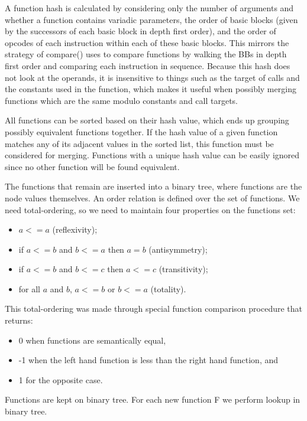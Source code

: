 A function hash is calculated by considering only the number of arguments and
whether a function contains variadic parameters, the order of basic blocks (given by the
successors of each basic block in depth first order), and the order of
opcodes of each instruction within each of these basic blocks.
This mirrors the strategy of compare() uses to compare functions by walking the BBs in depth
first order and comparing each instruction in sequence. Because this hash
does not look at the operands, it is insensitive to things such as the
target of calls and the constants used in the function, which makes it useful
when possibly merging functions which are the same modulo constants and call
targets.


All functions can be sorted based on their hash value, which ends up grouping
possibly equivalent functions together.
If the hash value of a given function matches any of its adjacent values in
the sorted list, this function must be considered for merging.
Functions with a unique hash value can be easily ignored since no other function
will be found equivalent.


The functions that remain are inserted into a binary tree, where functions are
the node values themselves.
An order relation is defined over the set of functions.
We need total-ordering, so we need to maintain four properties on the functions set:
\begin{itemize}
\item $a <= a$ (reflexivity);
\item if $a <= b$ and $b <= a$ then $a = b$ (antisymmetry);
\item if $a <= b$ and $b <= c$ then $a <= c$ (transitivity);
\item for all $a$ and $b$, $a <= b$ or $b <= a$ (totality).
\end{itemize}
This total-ordering was made through special function comparison procedure that
returns:
\begin{itemize}
\item 0 when functions are semantically equal,
\item -1 when the left hand function is less than the right hand function, and
\item 1 for the opposite case.
\end{itemize}

Functions are kept on binary tree. For each new function F we perform
lookup in binary tree.





